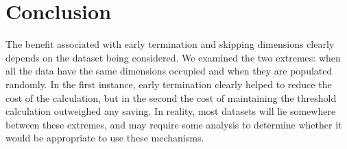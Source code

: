 \section{Conclusion}
The benefit associated with early termination and skipping dimensions clearly depends on the dataset being considered.  We examined the two extremes: when all the data have the same dimensions occupied and when they are populated randomly.  In the first instance, early termination clearly helped to reduce the cost of the calculation, but in the second the cost of maintaining the threshold calculation outweighed any saving.  In reality, most datasets will lie somewhere between these extremes, and may require some analysis to determine whether it would be appropriate to use these mechanisms.

